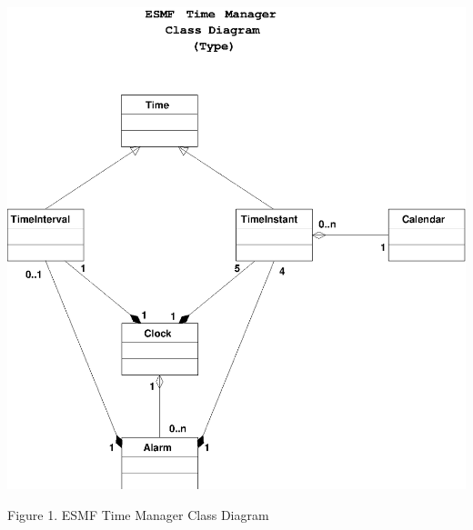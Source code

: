 \begin{center}
\includegraphics{TimeMgrClass.EPS}
   
Figure 1.  ESMF Time Manager Class Diagram
   
\end{center}
